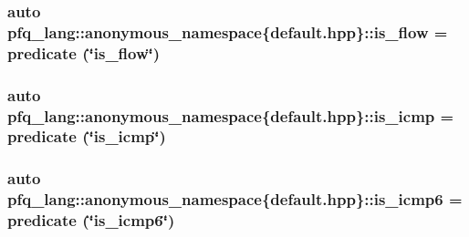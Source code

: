 \hypertarget{namespacepfq__lang_1_1anonymous__namespace_02default_8hpp_03_a32aab6804e2daac2458f7c050ed69cf1}{
\subsubsection[{is\-\_\-flow}]{\setlength{\rightskip}{0pt plus 5cm}auto pfq\-\_\-lang\-::anonymous\-\_\-namespace\{default.\-hpp\}\-::is\-\_\-flow = {\bf predicate} (\char`\"{}is\-\_\-flow\char`\"{})}}\label{namespacepfq__lang_1_1anonymous__namespace_02default_8hpp_03_a32aab6804e2daac2458f7c050ed69cf1}
\hypertarget{namespacepfq__lang_1_1anonymous__namespace_02default_8hpp_03_aecfdadd54cbd2d4e93a7f246b6bcd0fc}{
\subsubsection[{is\-\_\-icmp}]{\setlength{\rightskip}{0pt plus 5cm}auto pfq\-\_\-lang\-::anonymous\-\_\-namespace\{default.\-hpp\}\-::is\-\_\-icmp = {\bf predicate} (\char`\"{}is\-\_\-icmp\char`\"{})}}\label{namespacepfq__lang_1_1anonymous__namespace_02default_8hpp_03_aecfdadd54cbd2d4e93a7f246b6bcd0fc}
\hypertarget{namespacepfq__lang_1_1anonymous__namespace_02default_8hpp_03_abbce0d21ac217034eac2cd1366f78695}{
\subsubsection[{is\-\_\-icmp6}]{\setlength{\rightskip}{0pt plus 5cm}auto pfq\-\_\-lang\-::anonymous\-\_\-namespace\{default.\-hpp\}\-::is\-\_\-icmp6 = {\bf predicate} (\char`\"{}is\-\_\-icmp6\char`\"{})}}\label{namespacepfq__lang_1_1anonymous__namespace_02default_8hpp_03_abbce0d21ac217034eac2cd1366f78695}
